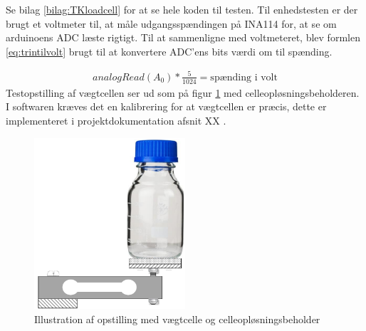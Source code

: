  Se bilag \ref{bilag:TKloadcell} for at se hele koden til testen. Til enhedstesten er der brugt et voltmeter til, at måle udgangsspændingen på INA114 for, at se om arduinoens ADC læste rigtigt. Til at sammenligne med voltmeteret, blev formlen \ref{eq:trintilvolt} brugt til at konvertere ADC'ens bits værdi om til spænding.
 
 \begin{align}
 analogRead(A_0)*\frac{5}{1024}=\text{spænding i volt}
 \label{eq:trintilvolt}
 \end{align}
Testopstilling af vægtcellen ser ud som på figur \ref{fig:loadcell_mont} med celleopløsningsbeholderen. I softwaren kræves det en kalibrering for at vægtcellen er præcis, dette er implementeret i projektdokumentation afsnit XX .
 
 \begin{figure}[H]
	\centering
	\includegraphics[width=0.5\textwidth]{billeder/Hardware/diagrammer/loadcell_montering.pdf}
	\caption{Illustration af opstilling med vægtcelle og celleopløsningsbeholder}
	\label{fig:loadcell_mont}
\end{figure}

